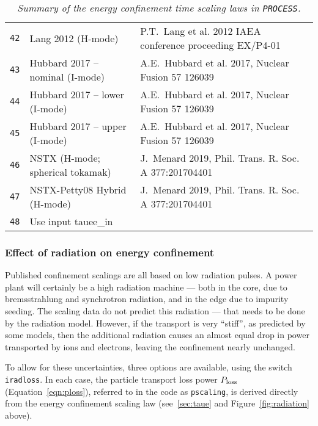 \documentclass[11pt,a4paper]{report}
\newcommand{\process}{\mbox{\texttt{PROCESS}}}
\begin{document}
\begin{table}[tbph]
\begin{center}
\begin{tabular}{||c||l|l||}
\texttt{42} & Lang 2012 (H-mode)& P.T.~Lang et al. 2012 IAEA conference proceeding EX/P4-01\\
\texttt{43} & Hubbard 2017 -- nominal (I-mode) & A.E.~Hubbard et al. 2017, Nuclear Fusion 57 126039\\
\texttt{44} & Hubbard 2017 -- lower (I-mode) & A.E.~Hubbard et al. 2017, Nuclear Fusion 57 126039\\
\texttt{45} & Hubbard 2017 -- upper (I-mode) & A.E.~Hubbard et al. 2017, Nuclear Fusion 57 126039\\
\texttt{46} & NSTX (H-mode; spherical tokamak) & J.~Menard 2019, Phil. Trans. R. Soc. A 377:201704401\\
\texttt{47} & NSTX-Petty08 Hybrid (H-mode) & J.~Menard 2019, Phil. Trans. R. Soc. A 377:201704401\\
\texttt{48} & Use input tauee\_in & \\
\hline
\end{tabular}
\normalsize
\end{center}
\caption[List of available energy confinement scaling laws]
{\label{tab:scaling_laws}
  \textit{Summary of the energy confinement time scaling laws in \process.}
}
\end{table}

\subsubsection*{Effect of radiation on energy confinement}
\label{sec:iradloss}

Published confinement scalings are all based on low radiation pulses. A power
plant will certainly be a high radiation machine --- both in the core, due to
bremsstrahlung and synchrotron radiation, and in the edge due to impurity
seeding. The scaling data do not predict this radiation --- that needs to be
done by the radiation model. However, if the transport is very ``stiff'', as
predicted by some models, then the additional radiation causes an almost equal
drop in power transported by ions and electrons, leaving the confinement
nearly unchanged.

To allow for these uncertainties, three options are available, using the
switch \texttt{iradloss}. In each case, the particle transport loss power $P_{\mbox{\scriptsize loss}}$ (Equation~\ref{eqn:ploss}), referred to in the code as \texttt{pscaling}, is
derived directly from the energy confinement scaling law (see~\ref{sec:taue} and Figure~\ref{fig:radiation} above).
\end{document}
